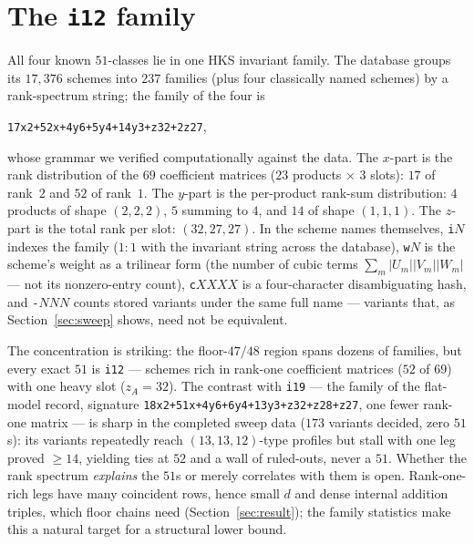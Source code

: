 \documentclass[11pt]{article}
\theoremstyle{definition}
\theoremstyle{remark}
\begin{document}
\section{The \texttt{i12} family}\label{sec:family}

All four known $51$-classes lie in one HKS invariant family.  The
database groups its $17{,}376$ schemes into $237$ families (plus four
classically named schemes) by a rank-spectrum string; the family of
the four is
\begin{center}
\texttt{17x2+\allowbreak 52x+\allowbreak 4y6+\allowbreak 5y4+\allowbreak 14y3+\allowbreak z32+\allowbreak 2z27},
\end{center}
whose grammar we verified computationally against the data.  The
$x$-part is the rank distribution of the $69$ coefficient matrices
($23$ products $\times$ $3$ slots): $17$ of rank~$2$ and $52$ of
rank~$1$.  The $y$-part is the per-product rank-sum distribution:
$4$ products of shape $(2,2,2)$, $5$ summing to $4$, and $14$ of
shape $(1,1,1)$.  The $z$-part is the total rank per slot:
$(32,27,27)$.  In the scheme names themselves, \texttt{i}$N$ indexes
the family ($1{:}1$ with the invariant string across the database),
\texttt{w}$N$ is the scheme's weight as a trilinear form (the number
of cubic terms $\sum_m |U_m||V_m||W_m|$ --- not its nonzero-entry
count), \texttt{c}$XXXX$ is a four-character disambiguating hash, and
\texttt{-}$NNN$ counts stored variants under the same full name ---
variants that, as Section~\ref{sec:sweep} shows, need not be
equivalent.

The concentration is striking: the floor-$47/48$ region spans dozens
of families, but every exact $51$ is \texttt{i12} --- schemes rich in
rank-one coefficient matrices ($52$ of $69$) with one heavy slot
($z_A=32$).  The contrast with \texttt{i19} --- the family of the
flat-model record, signature
\texttt{18x2+\allowbreak 51x+\allowbreak 4y6+\allowbreak 6y4+\allowbreak 13y3+\allowbreak z32+\allowbreak z28+\allowbreak z27}, one fewer rank-one
matrix --- is sharp in the completed sweep data ($173$ variants
decided, zero $51$s): its variants repeatedly reach
$(13,13,12)$-type profiles but stall with one leg proved $\ge14$,
yielding ties at $52$ and a wall of ruled-outs, never a $51$.
Whether the rank spectrum \emph{explains} the $51$s or merely
correlates with them is open.  Rank-one-rich legs have many coincident
rows, hence small $d$ and dense internal addition triples, which floor
chains need (Section~\ref{sec:result}); the family statistics make
this a natural target for a structural lower bound.
\end{document}
